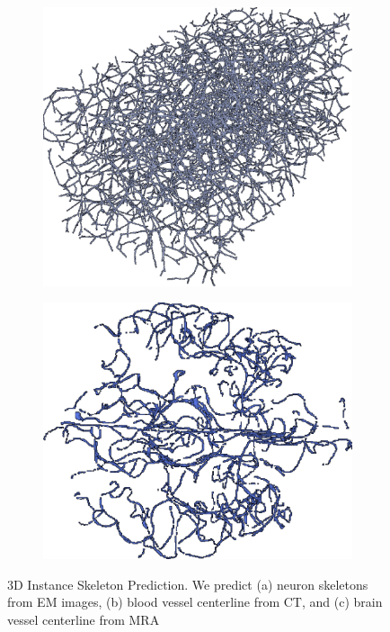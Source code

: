 \begin{figure}[t]
	\hfill
	\begin{subfigure}[b]{\hwidth}
		\includegraphics[height=.80\textwidth, width=\textwidth,keepaspectratio]{figures/intro/ct_skel.png}
		\caption{\label{fig:intro_ct}}
	\end{subfigure}
	\hfill
	\begin{subfigure}[b]{\hwidth}
		\includegraphics[height=.80\textwidth, width=\textwidth,keepaspectratio]{figures/intro/mri_skel.png}
		\caption{\label{fig:intro_mri}}
	\end{subfigure}
	\hfill\null
	\caption{3D Instance Skeleton Prediction. We predict (a) neuron skeletons from EM images, (b) blood vessel centerline from CT, and (c) brain vessel centerline from MRA}
	\label{fig:intro}
\end{figure}


